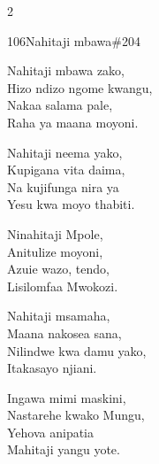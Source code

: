 \begin{multicols}{2}
\begin{hymn}{106}{Nahitaji mbawa}{\#204}
\begin{stanza}
Nahitaji mbawa zako,\\
Hizo ndizo ngome kwangu,\\
Nakaa salama pale,\\
Raha ya maana moyoni.
\end{stanza}
\begin{stanza}
Nahitaji neema yako,\\
Kupigana vita daima,\\
Na kujifunga nira ya\\
Yesu kwa moyo thabiti.
\end{stanza}
\begin{stanza}
Ninahitaji Mpole,\\
Anitulize moyoni,\\
Azuie wazo, tendo,\\
Lisilomfaa Mwokozi.
\end{stanza}
\begin{stanza}
Nahitaji msamaha,\\
Maana nakosea sana,\\
Nilindwe kwa damu yako,\\
Itakasayo njiani.
\end{stanza}
\begin{stanza}
Ingawa mimi maskini,\\
Nastarehe kwako Mungu,\\
Yehova anipatia\\
Mahitaji yangu yote.
\end{stanza}
\end{hymn}


\end{multicols}
